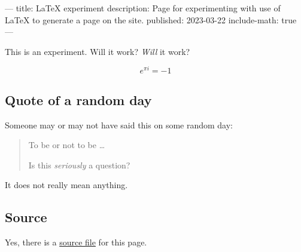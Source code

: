 ---
title: LaTeX experiment
description: Page for experimenting with use of LaTeX to generate a page on the site.
published: 2023-03-22
include-math: true
---
\usepackage{hyperref}

This is an experiment.  Will it work?  \emph{Will} it work?

\[ e^{\pi i} = -1 \]

\subsection{Quote of a random day}

Someone may or may not have said this on some random day:

\begin{quote}
  To be or not to be \ldots

  Is this \emph{seriously} a question?
\end{quote}

It does not really mean anything.

\subsection{Source}

Yes, there is a \href{https://github.com/chungyc/site-personal/tree/main/site/article/technical/website/experiments/latex.tex}{source file}
for this page.

